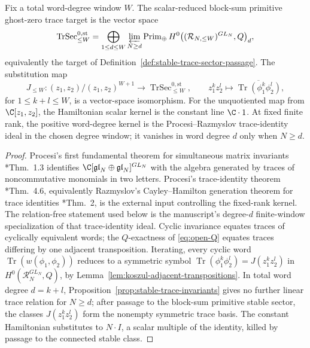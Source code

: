 \documentclass[11pt]{memoir}
\begin{document}
\begin{lem}\label{lem:formal-stalk-trace}
  Fix a total word-degree window \(W\).  The scalar-reduced block-sum
  primitive ghost-zero trace target is the vector space
  \[
    \operatorname{TrSec}^{0,\mathrm{st}}_{\leq W}
    =
    \bigoplus_{1\leq d\leq W}
    \varprojlim_{N\geq d}
    \operatorname{Prim}_{\oplus}
    H^0\bigl((\mathcal R_{N,\leq W})^{GL_N},Q\bigr)_d ,
  \]
  equivalently the target of
  Definition~\ref{def:stable-trace-sector-passage}.  The substitution
  map
  \[
    J_{\le W}\colon
    (z_1,z_2)/(z_1,z_2)^{W+1}
    \longrightarrow
    \operatorname{TrSec}^{0,\mathrm{st}}_{\le W},
    \qquad
    z_1^kz_2^l\longmapsto
    \overline{\operatorname{Tr}(\phi_1^k\phi_2^l)},
  \]
  for \(1\leq k+l\leq W\), is a vector-space isomorphism.  For the
  unquotiented map from \(\C[z_1,z_2]\), the Hamiltonian scalar kernel
  is the constant line \(\C\cdot1\).  At fixed finite rank, the positive
  word-degree kernel is the Procesi--Razmyslov trace-identity ideal in
  the chosen degree window; it vanishes in word degree \(d\) only when
  \(N\geq d\).
\end{lem}

\begin{proof}
  Procesi's first fundamental theorem for simultaneous matrix
  invariants \cite{procesi}*{Thm.~1.3} identifies
  \(\C[\mathfrak{gl}_N\oplus\mathfrak{gl}_N]^{GL_N}\) with the algebra
  generated by traces of noncommutative monomials in two letters.
  Procesi's trace-identity theorem \cite{procesi}*{Thm.~4.6}, equivalently
  Razmyslov's Cayley--Hamilton generation theorem for trace identities
  \cite{razmyslov}*{Thm.~2}, is the external input controlling the
  fixed-rank kernel.  The relation-free statement used below is the
  manuscript's degree-\(d\) finite-window specialization of that
  trace-identity ideal.
  Cyclic invariance equates traces of cyclically equivalent words; the
  \(Q\)-exactness of \eqref{eq:open-Q} equates traces differing by one
  adjacent transposition.  Iterating, every cyclic word
  \(\operatorname{Tr}(w(\phi_1,\phi_2))\) reduces to a symmetric symbol
  \(\operatorname{Tr}(\phi_1^k\phi_2^l)=J(z_1^kz_2^l)\) in
  \(H^0(\mathcal R_N^{GL_N},Q)\), by
  Lemma~\ref{lem:koszul-adjacent-transpositions}.  In total word
  degree \(d=k+l\), Proposition~\ref{prop:stable-trace-invariants}
  gives no further linear trace relation for \(N\geq d\); after
  passage to the block-sum primitive stable sector, the classes
  \(J(z_1^kz_2^l)\) form the nonempty symmetric trace basis.  The
  constant Hamiltonian substitutes to \(N\cdot I\), a scalar multiple
  of the identity, killed by passage to the connected stable class.
\end{proof}
\end{document}
